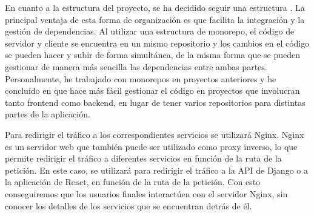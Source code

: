 En cuanto a la estructura del proyecto, se ha decidido seguir una estructura . La principal ventaja de esta forma de organización es que facilita la integración y la gestión de dependencias. Al utilizar una estructura de monorepo, el código de servidor y cliente se encuentra en un mismo repositorio y los cambios en el código se pueden hacer y subir de forma simultánea, de la misma forma que se pueden gestionar de manera más sencilla las dependencias entre ambas partes. Personalmente, he trabajado con monorepos en proyectos anteriores y he concluído en que hace más fácil gestionar el código en proyectos que involucran tanto frontend como backend, en lugar de tener varios repositorios para distintas partes de la aplicación.

Para redirigir el tráfico a los correspondientes servicios se utilizará Nginx. Nginx es un servidor web que también puede ser utilizado como proxy inverso, lo que permite redirigir el tráfico a diferentes servicios en función de la ruta de la petición. En este caso, se utilizará para redirigir el tráfico a la API de Django o a la aplicación de React, en función de la ruta de la petición. Con esto conseguiremos que los usuarios finales interactúen con el servidor Nginx, sin conocer los detalles de los servicios que se encuentran detrás de él.


